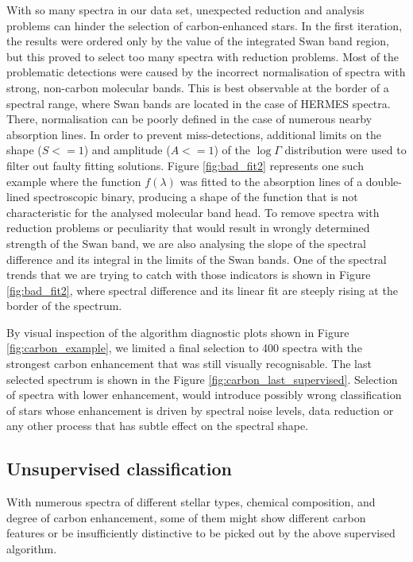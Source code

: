 With so many spectra in our data set, unexpected reduction and analysis problems can hinder the selection of carbon-enhanced stars. In the first iteration, the results were ordered only by the value of the integrated Swan band region, but this proved to select too many spectra with reduction problems. Most of the problematic detections were caused by the incorrect normalisation of spectra with strong, non-carbon molecular bands. This is best observable at the border of a spectral range, where Swan bands are located in the case of HERMES spectra. There, normalisation can be poorly defined in the case of numerous nearby absorption lines. In order to prevent miss-detections, additional limits on the shape ($S <= 1$) and amplitude ($A <= 1$) of the $\log{}\Gamma$ distribution were used to filter out faulty fitting solutions. Figure \ref{fig:bad_fit2} represents one such example where the function $f(\lambda)$ was fitted to the absorption lines of a double-lined spectroscopic binary, producing a shape of the function that is not characteristic for the analysed molecular band head. To remove spectra with reduction problems or peculiarity that would result in wrongly determined strength of the Swan band, we are also analysing the slope of the spectral difference and its integral in the limits of the Swan bands. One of the spectral trends that we are trying to catch with those indicators is shown in Figure \ref{fig:bad_fit2}, where spectral difference and its linear fit are steeply rising at the border of the spectrum.

By visual inspection of the algorithm diagnostic plots shown in Figure \ref{fig:carbon_example}, we limited a final selection to 400 spectra with the strongest carbon enhancement that was still visually recognisable. The last selected spectrum is shown in the Figure \ref{fig:carbon_last_supervised}. Selection of spectra with lower enhancement, would introduce possibly wrong classification of stars whose enhancement is driven by spectral noise levels, data reduction or any other process that has subtle effect on the spectral shape.

\subsection{Unsupervised classification}
\label{sec:unsupervised}
With numerous spectra of different stellar types, chemical composition, and degree of carbon enhancement, some of them might show different carbon features or be insufficiently distinctive to be picked out by the above supervised algorithm.

